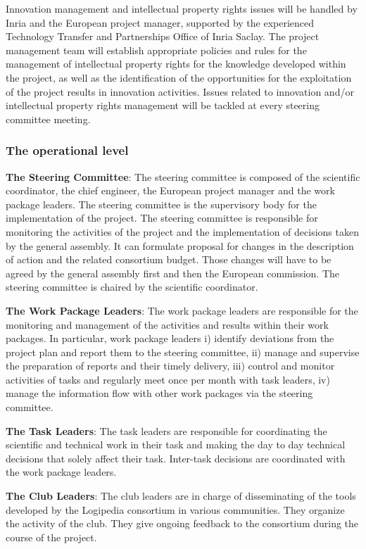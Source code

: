 Innovation management and intellectual property rights issues will be
handled by Inria and the European project manager, supported by the
experienced Technology Transfer and Partnerships Office of Inria
Saclay. The project management team will establish appropriate
policies and rules for the management of intellectual property rights
for the knowledge developed within the project, as well as the
identification of the opportunities for the exploitation of the
project results in innovation activities. Issues related to innovation
and/or intellectual property rights management will be tackled at
every steering committee meeting.

\subsubsection*{The operational level}

{\bf The Steering Committee}: The steering committee is composed of
the scientific coordinator, the chief engineer, the European project
manager and the work package leaders. The steering committee is the
supervisory body for the implementation of the project. The steering
committee is responsible for monitoring the activities of the project
and the implementation of decisions taken by the general assembly. It
can formulate proposal for changes in the description of action and
the related consortium budget. Those changes will have to be agreed
by the general assembly first and then the European
commission. The steering committee is chaired by the scientific
coordinator.

{\bf The Work Package Leaders}: The work package leaders are
responsible for the monitoring and management of the activities and
results within their work packages. In particular, work package
leaders i) identify deviations from the project plan and report them
to the steering committee, ii) manage and supervise the preparation of
reports and their timely delivery, iii) control and monitor activities
of tasks and regularly meet once per month with task leaders, iv)
manage the information flow with other work packages via the steering
committee.

{\bf The Task Leaders}: The task leaders are responsible for
coordinating the scientific and technical work in their task and
making the day to day technical decisions that solely affect their
task. Inter-task decisions are coordinated with the work package
leaders.

{\bf The Club Leaders}: The club leaders are in charge of
disseminating of the tools developed by the Logipedia consortium in
various communities. They organize the activity of the club. They give
ongoing feedback to the consortium during the course of the project.


